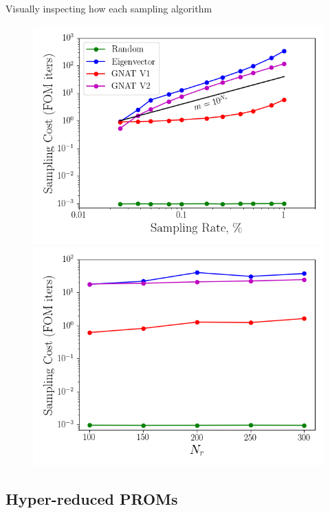 Visually inspecting how each sampling algorithm

\begin{figure}
	\begin{minipage}{0.49\linewidth}
		\includegraphics[width=0.99\linewidth]{Chapters/CavityAndCVRC/Images/cvrc/deim/samp_timing_wrt_samprate.png}
	\end{minipage}
	\begin{minipage}{0.49\linewidth}
		\includegraphics[width=0.99\linewidth]{Chapters/CavityAndCVRC/Images/cvrc/deim/samp_timing_wrt_modes.png}
	\end{minipage}
\end{figure}

\subsection{Hyper-reduced PROMs}



